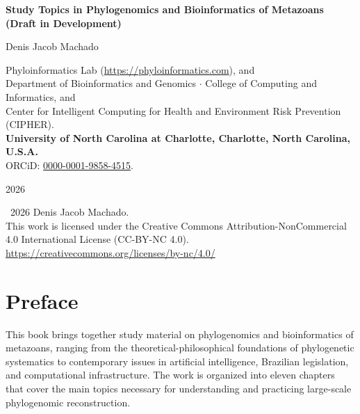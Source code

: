 \documentclass[11pt,a4paper,openright,twoside]{book}
\theoremstyle{definition}
\theoremstyle{plain}
\theoremstyle{remark}
\begin{document}
\frontmatter

\begin{titlepage}
\centering
\vspace*{3cm}
{\Huge\bfseries Study Topics in Phylogenomics and Bioinformatics of Metazoans (Draft in Development)\par}
\vspace{1.5cm}
{\Large Denis Jacob Machado\par}
\vspace{0.5cm}
{\scriptsize
    Phyloinformatics Lab (\url{https://phyloinformatics.com}), and\\
    Department of Bioinformatics and Genomics $\cdot$ College of Computing and Informatics, and\\
    Center for Intelligent Computing for Health and Environment Risk Prevention (CIPHER).\\
    \textbf{University of North Carolina at Charlotte, Charlotte, North Carolina, U.S.A.}\\
    ORCiD: \href{https://orcid.org/0000-0001-9858-4515}{0000-0001-9858-4515}.\\
    \par
}
\vfill
{\large 2026\par}
\end{titlepage}

\newpage
\thispagestyle{empty}
\vspace*{\fill}
\noindent
\textcopyright\ 2026 Denis Jacob Machado.\\[0.5em]
This work is licensed under the Creative Commons
Attribution-NonCommercial 4.0 International License (CC-BY-NC 4.0).\\[0.5em]
\url{https://creativecommons.org/licenses/by-nc/4.0/}
\vspace{2cm}

\tableofcontents

\chapter{Preface}

    This book brings together study material on phylogenomics and bioinformatics of metazoans, ranging from the theoretical-philosophical foundations of phylogenetic systematics to contemporary issues in artificial intelligence, Brazilian legislation, and computational infrastructure. The work is organized into eleven chapters that cover the main topics necessary for understanding and practicing large-scale phylogenomic reconstruction.
\end{document}
